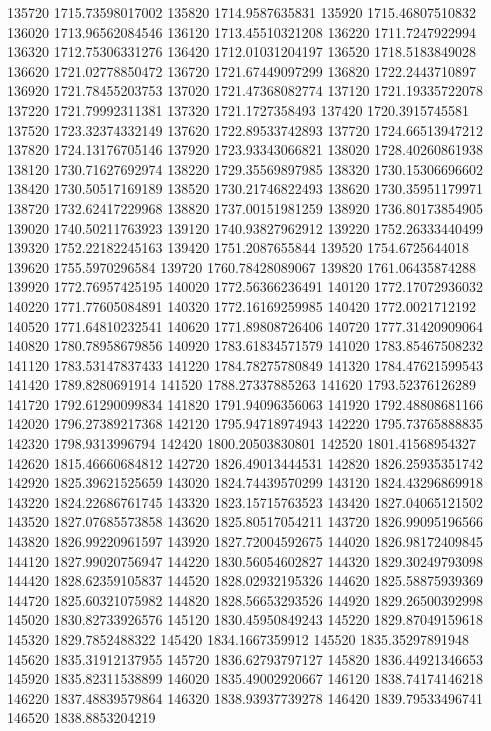 {135720 1715.73598017002
135820 1714.9587635831
135920 1715.46807510832
136020 1713.96562084546
136120 1713.45510321208
136220 1711.7247922994
136320 1712.75306331276
136420 1712.01031204197
136520 1718.5183849028
136620 1721.02778850472
136720 1721.67449097299
136820 1722.2443710897
136920 1721.78455203753
137020 1721.47368082774
137120 1721.19335722078
137220 1721.79992311381
137320 1721.1727358493
137420 1720.3915745581
137520 1723.32374332149
137620 1722.89533742893
137720 1724.66513947212
137820 1724.13176705146
137920 1723.93343066821
138020 1728.40260861938
138120 1730.71627692974
138220 1729.35569897985
138320 1730.15306696602
138420 1730.50517169189
138520 1730.21746822493
138620 1730.35951179971
138720 1732.62417229968
138820 1737.00151981259
138920 1736.80173854905
139020 1740.50211763923
139120 1740.93827962912
139220 1752.26333440499
139320 1752.22182245163
139420 1751.2087655844
139520 1754.6725644018
139620 1755.5970296584
139720 1760.78428089067
139820 1761.06435874288
139920 1772.76957425195
140020 1772.56366236491
140120 1772.17072936032
140220 1771.77605084891
140320 1772.16169259985
140420 1772.0021712192
140520 1771.64810232541
140620 1771.89808726406
140720 1777.31420909064
140820 1780.78958679856
140920 1783.61834571579
141020 1783.85467508232
141120 1783.53147837433
141220 1784.78275780849
141320 1784.47621599543
141420 1789.8280691914
141520 1788.27337885263
141620 1793.52376126289
141720 1792.61290099834
141820 1791.94096356063
141920 1792.48808681166
142020 1796.27389217368
142120 1795.94718974943
142220 1795.73765888835
142320 1798.9313996794
142420 1800.20503830801
142520 1801.41568954327
142620 1815.46660684812
142720 1826.49013444531
142820 1826.25935351742
142920 1825.39621525659
143020 1824.74439570299
143120 1824.43296869918
143220 1824.22686761745
143320 1823.15715763523
143420 1827.04065121502
143520 1827.07685573858
143620 1825.80517054211
143720 1826.99095196566
143820 1826.99220961597
143920 1827.72004592675
144020 1826.98172409845
144120 1827.99020756947
144220 1830.56054602827
144320 1829.30249793098
144420 1828.62359105837
144520 1828.02932195326
144620 1825.58875939369
144720 1825.60321075982
144820 1828.56653293526
144920 1829.26500392998
145020 1830.82733926576
145120 1830.45950849243
145220 1829.87049159618
145320 1829.7852488322
145420 1834.1667359912
145520 1835.35297891948
145620 1835.31912137955
145720 1836.62793797127
145820 1836.44921346653
145920 1835.82311538899
146020 1835.49002920667
146120 1838.74174146218
146220 1837.48839579864
146320 1838.93937739278
146420 1839.79533496741
146520 1838.8853204219
}
